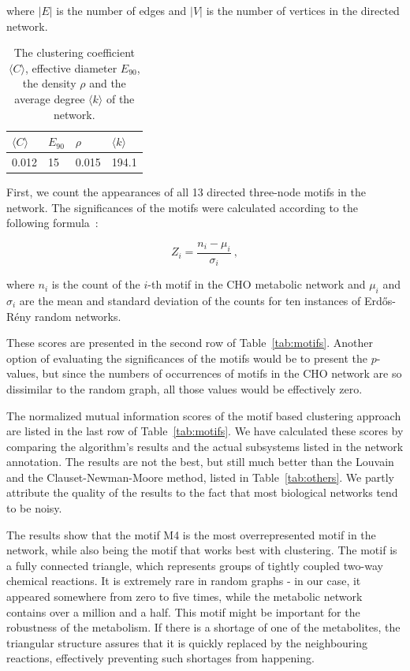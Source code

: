 \noindent
where $|E|$ is the number of edges and $|V|$ is the number of vertices in the
directed network.

\begin{table}
  \centering
  \begin{tabular}{l|l|l|l}
    $\langle C \rangle$ & $E_{90}$ & $\rho$ & $\langle k \rangle$ \\ \hline
    0.012 & 15 & 0.015 & 194.1
  \end{tabular}
  \caption{The clustering coefficient $\langle C\rangle$, effective diameter
    $E_{90}$, the density $\rho$ and the average degree $\langle k \rangle$ of
    the network.}
  \label{tab:metrics}
\end{table}

First, we count the appearances of all 13 directed three-node motifs in the
network. The significances of the motifs were calculated according to the
following formula~\cite{milo2002network}:

\begin{equation}
  Z_i = \frac{n_i - \mu_i}{\sigma_i}\ ,
\end{equation}

\noindent
where $n_i$ is the count of the $i$-th motif in the CHO metabolic network
and $\mu_{i}$ and $\sigma_{i}$ are the mean and standard deviation of the
counts for ten instances of Erdős-Rény random networks.

These scores are presented in the second row of Table~\ref{tab:motifs}. Another
option of evaluating the significances of the motifs would be to present the
$p$-values, but since the numbers of occurrences of motifs in the CHO network are
so dissimilar to the random graph, all those values would be effectively zero.

The normalized mutual information scores of the motif based clustering approach
are listed in the last row of Table~\ref{tab:motifs}. We have calculated these
scores by comparing the algorithm's results and the actual subsystems listed in
the network annotation. The results are not the best, but still much better than
the Louvain and the Clauset-Newman-Moore method, listed in
Table~\ref{tab:others}. We partly attribute the quality of the results to the
fact that most biological networks tend to be noisy.

The results show that the motif M4 is the most overrepresented motif in the
network, while also being the motif that works best with clustering. The motif
is a fully connected triangle, which represents groups of tightly coupled
two-way chemical reactions. It is extremely rare in random graphs - in our case,
it appeared somewhere from zero to five times, while the metabolic network
contains over a million and a half. This motif might be important for the
robustness of the metabolism. If there is a shortage of one of the metabolites,
the triangular structure assures that it is quickly replaced by the neighbouring
reactions, effectively preventing such shortages from happening.

